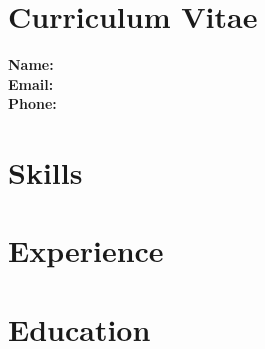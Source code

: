 \documentclass{article}
\begin{document}
\section*{Curriculum Vitae}
\textbf{Name:}  \\
\textbf{Email:}  \\
\textbf{Phone:}  \\

\section*{Skills}

\section*{Experience}

\section*{Education}
\end{document}
